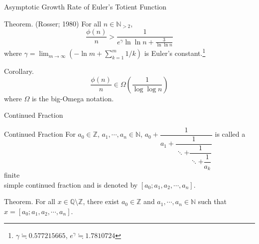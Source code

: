 \documentclass{beamer}
\newcommand{\mbb}[1]{\mathbb{#1}}
\renewcommand{\:}{\text{ }}
\begin{document}
    \hypertarget{phigrowth}{
    \begin{frame}{Asymptotic Growth Rate of Euler's Totient Function}
        \begin{exampleblock}{Theorem. (Rosser; 1980) \href{https://projecteuclid.org/journals/illinois-journal-of-mathematics/volume-6/issue-1/Approximate-formulas-for-some-functions-of-prime-numbers/10.1215/ijm/1255631807.full}{}}
            For all $n \in \mbb{N}_{>2}$,
            \[ \frac{\phi(n)}{n} > \frac{1}{e^\gamma \ln \ln n + \frac{\displaystyle 3}{\displaystyle \ln \ln n}} \]
            where $\gamma = \lim_{m \to \infty} \left( -\ln m + \sum_{k=1}^m 1/k \right)$
            is Euler's constant.\footnote{$\gamma \fallingdotseq 0.577215665$, $e^\gamma \fallingdotseq 1.7810724$}
        \end{exampleblock}
        \begin{exampleblock}{Corollary.}
            \[ \frac{\phi(n)}{n} \in \Omega\left( \frac{1}{\log \log n} \right) \]
            where $\Omega$ is the big-Omega notation.
        \end{exampleblock}
    \end{frame}}

    \begin{frame}{Continued Fraction}
        \begin{exampleblock}{Continued Fraction}
            For $a_0 \in \mbb{Z}$, $a_1, \cdots, a_n \in \mbb{N}$, $a_0 + \dfrac{1}{a_1+ \dfrac{1}{\ddots + \dfrac{1}{\ddots + \dfrac{1}{a_k}}}}$
            is called a  \alert{finite} \\[.5em] \alert{simple continued fraction} and is denoted by $[a_0;a_1,a_2,\cdots,a_n]$.
        \end{exampleblock}
        \begin{exampleblock}{Theorem.}
            For all $x \in \mbb{Q} \setminus \mbb{Z}$, there exist $a_0 \in \mbb{Z}$ and $a_1, \cdots, a_n \in \mbb{N}$ such that $x = [a_0;a_1,a_2,\cdots,a_n]$.
        \end{exampleblock}
    \end{frame}
\end{document}

